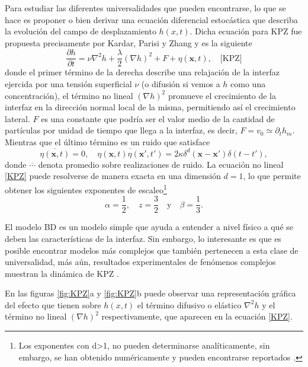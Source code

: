 Para estudiar las diferentes universalidades que pueden encontrarse, lo que se hace es proponer o bien derivar una ecuación diferencial estocástica que describa la evolución del campo de desplazamiento $h(x,t)$. Dicha ecuación para KPZ fue propuesta precisamente por Kardar, Parisi y Zhang \cite{PhysRevLett.56.889} y es la siguiente
\begin{equation}
    \frac{\partial h}{\partial t} = \nu \nabla^2h + \frac{\lambda}{2} \left(\nabla h\right)^2 + F + \eta(\mathbf{x},t), \quad \text{[KPZ]}
    \label{KPZ}
\end{equation}
donde el primer término de la derecha describe una relajación de la interfaz ejercida por una tensión superficial $\nu$ (o difusión si vemos a $h$ como una concentración), el término no lineal $\left(\nabla h\right)^2$ promueve el crecimiento de la interfaz en la dirección normal local de la misma, permitiendo así el crecimiento lateral. $F$ es una constante que podría ser el valor medio de la cantidad de partículas por unidad de tiempo que llega a la interfaz, es decir, $F=v_0 \simeq \partial_t h_m$. Mientras que el último término es un ruido que satisface
\begin{equation}
    \overline{\eta(\mathbf{x},t)} = 0, \quad \overline{\eta(\mathbf{x},t)\eta(\mathbf{x'},t')} = 2\kappa\delta^d(\mathbf{x}-\mathbf{x'})\delta(t-t'),
\end{equation}
donde $\overline{\cdots}$ denota promedio sobre realizaciones de ruido. La ecuación no lineal \ref{KPZ} puede resolverse de manera exacta en una dimensión $d=1$, lo que permite obtener los siguientes exponentes de escaleo\footnote{Los exponentes con d>1, no pueden determinarse analíticamente, sin embargo, se han obtenido numéricamente y pueden encontrarse reportados \cite{barabasi}.}
\begin{equation}
    \alpha = \frac{1}{2}, \quad z = \frac{3}{2} \quad \text{y} \quad \beta = \frac{1}{3}.
\end{equation}

El modelo BD es un modelo simple que ayuda a entender a nivel físico a qué se deben las características de la interfaz. Sin embargo, lo interesante es que 
es posible encontrar modelos más complejos que también pertenecen a esta clase de universalidad, más aún, resultados experimentales de fenómenos complejos muestran 
la dinámica de KPZ \cite{PhysRevE.96.013107,PhysRevE.74.041116}.

En las figuras \ref{fig:KPZ}a y \ref{fig:KPZ}b puede observar una representación gráfica del efecto que tienen sobre $h(x,t)$ el término difusivo o elástico $\nabla^2h$ y el término no lineal $\left(\nabla h\right)^2$ respectivamente, que aparecen en la ecuación \ref{KPZ}. 

